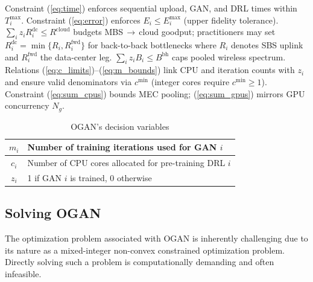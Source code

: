 \documentclass[letterpaper%
, twoside%
, 12pt%
,memoire%
, english%
,creativecommons,hyperref, withAlgo2e %
]{thETS}
\numberwithin{algorithm}{chapter}
\begin{document}
Constraint (\ref{eq:time}) enforces sequential upload, GAN, and DRL times within \(T_i^{\max}\). Constraint (\ref{eq:error}) enforces \(E_i\le E_i^{\max}\) (upper fidelity tolerance). \(\sum_i z_i R_i^{\mathrm{dc}}\le R^{\mathrm{cloud}}\) budgets MBS\,$\rightarrow$\,cloud goodput; practitioners may set \(R_i^{\mathrm{dc}}=\min\{R_i,R_i^{\mathrm{fwd}}\}\) for back-to-back bottlenecks where \(R_i\) denotes SBS uplink and \(R_i^{\mathrm{fwd}}\) the data-center leg. \(\sum_i z_i B_i\le B^{\mathrm{bh}}\) caps pooled wireless spectrum. Relations (\ref{eq:c_limits})--(\ref{eq:m_bounds}) link CPU and iteration counts with \(z_i\) and ensure valid denominators via \(c^{\min}\) (integer cores require \(c^{\min}\ge1\)). Constraint (\ref{eq:sum_cpus}) bounds MEC pooling; (\ref{eq:sum_gpus}) mirrors GPU concurrency \(N_g\).



\begin{table}[t]
\centering
\caption{OGAN's decision variables}
\label{tab:ogan_decision_vars}
\renewcommand{\arraystretch}{1.5} %
\begin{tabular}{|c|l|}
\hline

$m_i$ & Number of training iterations used for GAN $i$ \\
\hline
$c_i$ & Number of CPU cores allocated for pre-training DRL $i$ \\
\hline
$z_i$ & 1 if GAN $i$ is trained, 0 otherwise \\
\hline
\end{tabular}
\end{table}


\subsection{Solving OGAN}

The optimization problem associated with OGAN is inherently challenging due to its nature as a mixed-integer non-convex constrained optimization problem. Directly solving such a problem is computationally demanding and often infeasible. 



% 
\end{document}
